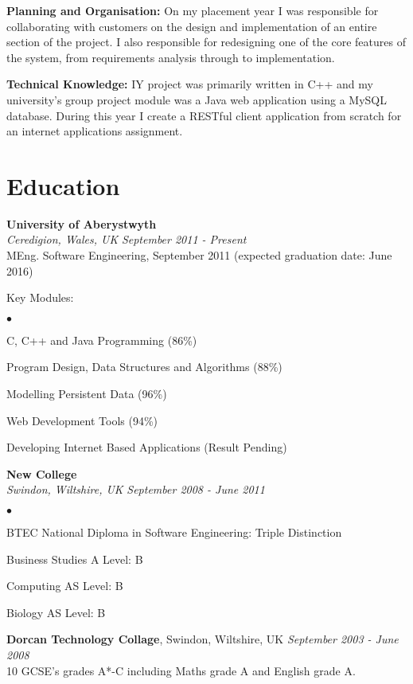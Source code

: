 \documentclass[margin,line]{res}
\newenvironment{list2}{
  \begin{list}{$\bullet$}{%
      \setlength{\itemsep}{0in}
      \setlength{\parsep}{0in} \setlength{\parskip}{0in}
      \setlength{\topsep}{0in} \setlength{\partopsep}{0in}
      \setlength{\leftmargin}{0.2in}}}{\end{list}}
\begin{document}
\begin{resume}
{\bf Planning and Organisation:} On my placement year I was responsible for collaborating with customers on the design and implementation of an entire section of the project. I also responsible for redesigning one of the core features of the system, from requirements analysis through to implementation.

{\bf Technical Knowledge:} IY project was primarily written in C++ and my university's group project module was a Java web application using a MySQL database. During this year I create a RESTful client application from scratch for an internet applications assignment.

\section{\sc Education}
{\bf University of Aberystwyth}\\
{\it Ceredigion, Wales, UK} \hfill {\it September 2011 - Present}\\
MEng. Software Engineering, September 2011 (expected graduation date: June 2016)

Key Modules:
\begin{list2}

\item C, C++ and Java Programming (86\%)
\item Program Design, Data Structures and Algorithms (88\%)
\item Modelling Persistent Data (96\%)
\item Web Development Tools (94\%)
\item Developing Internet Based Applications (Result Pending)
\end{list2}

{\bf New College}\\
{\it Swindon, Wiltshire, UK} \hfill {\it September 2008 - June 2011}
\begin{list2}
\item BTEC National Diploma in Software Engineering: Triple Distinction
\item Business Studies A Level: B
\item Computing AS Level: B
\item Biology AS Level: B
\end{list2}

{\bf Dorcan Technology Collage}, Swindon, Wiltshire, UK \hfill {\it September 2003 - June 2008}\\
10 GCSE's grades A*-C including Maths grade A and English grade A.


\end{resume}
\end{document}
